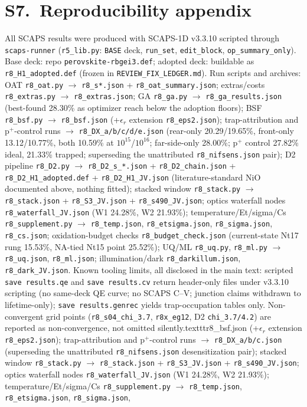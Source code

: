 \documentclass[11pt]{article}
\begin{document}
\section*{S7.\ Reproducibility appendix}
All SCAPS results were produced with SCAPS-1D v3.3.10 scripted through \texttt{scaps-runner} (\texttt{r5\_lib.py}: \texttt{BASE} deck, \texttt{run\_set}, \texttt{edit\_block}, \texttt{op\_summary\_only}). Base deck: repo \texttt{perovskite-rbgei3.def}; adopted deck: buildable as \texttt{r8\_H1\_adopted.def} (frozen in \texttt{REVIEW\_FIX\_LEDGER.md}). Run scripts and archives: OAT \texttt{r8\_oat.py} $\rightarrow$ \texttt{r8\_s*.json} + \texttt{r8\_oat\_summary.json}; extras/costs \texttt{r8\_extras.py} $\rightarrow$ \texttt{r8\_extras.json}; GA \texttt{r8\_ga.py} $\rightarrow$ \texttt{r8\_ga\_results.json} (best-found 28.30\% as optimizer reach below the adoption floors); BSF \texttt{r8\_bsf.py} $\rightarrow$ \texttt{r8\_bsf.json} (+$\epsilon_{r}$ extension \texttt{r8\_eps2.json}); trap-attribution and p$^{+}$-control runs $\rightarrow$ \texttt{r8\_DX\_a/b/c/d/e.json} (rear-only 20.29/19.65\%, front-only 13.12/10.77\%, both 10.59\% at $10^{15}$/$10^{16}$; far-side-only 28.00\%; p$^{+}$ control 27.82\% ideal, 21.33\% trapped; superseding the unattributed \texttt{r8\_nifsens.json} pair); D2 pipeline \texttt{r8\_D2.py} $\rightarrow$ \texttt{r8\_D2\_s\_*.json} + \texttt{r8\_D2\_chain.json} + \texttt{r8\_D2\_H1\_adopted.def} + \texttt{r8\_D2\_H1\_JV.json} (literature-standard NiO documented above, nothing fitted); stacked window \texttt{r8\_stack.py} $\rightarrow$ \texttt{r8\_stack.json} + \texttt{r8\_S3\_JV.json} + \texttt{r8\_s490\_JV.json}; optics waterfall nodes \texttt{r8\_waterfall\_JV.json} (W1 24.28\%, W2 21.93\%); temperature/Et/sigma/Cs \texttt{r8\_supplement.py} $\rightarrow$ \texttt{r8\_temp.json}, \texttt{r8\_etsigma.json}, \texttt{r8\_sigma.json}, \texttt{r8\_cs.json}; oxidation-budget checks \texttt{r8\_budget\_check.json} (current-state Nt17 rung 15.53\%, NA-tied Nt15 point 25.52\%); UQ/ML \texttt{r8\_uq.py}, \texttt{r8\_ml.py} $\rightarrow$ \texttt{r8\_uq.json}, \texttt{r8\_ml.json}; illumination/dark \texttt{r8\_darkillum.json}, \texttt{r8\_dark\_JV.json}. Known tooling limits, all disclosed in the main text: scripted \texttt{save results.qe} and \texttt{save results.cv} return header-only files under v3.3.10 scripting (no same-deck QE curve; no SCAPS C--V; junction claims withdrawn to lifetime-only); \texttt{save results.genrec} yields trap-occupation tables only. Non-convergent grid points (\texttt{r8\_s04\_chi\_3.7}, \texttt{r8x\_eg12}, D2 \texttt{chi\_3.7/4.2}) are reported as non-convergence, not omitted silently.texttt{r8\_bsf.json} (+$\epsilon_{r}$ extension \texttt{r8\_eps2.json}); trap-attribution and p$^{+}$-control runs $\rightarrow$ \texttt{r8\_DX\_a/b/c.json} (superseding the unattributed \texttt{r8\_nifsens.json} desensitization pair); stacked window \texttt{r8\_stack.py} $\rightarrow$ \texttt{r8\_stack.json} + \texttt{r8\_S3\_JV.json} + \texttt{r8\_s490\_JV.json}; optics waterfall nodes \texttt{r8\_waterfall\_JV.json} (W1 24.28\%, W2 21.93\%); temperature/Et/sigma/Cs \texttt{r8\_supplement.py} $\rightarrow$ \texttt{r8\_temp.json}, \texttt{r8\_etsigma.json}, \texttt{r8\_sigma.json}, 
\end{document}

